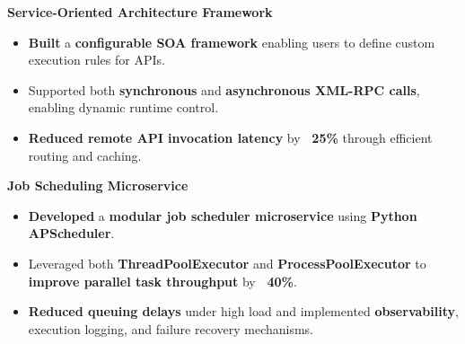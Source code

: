 \documentclass[11 pt]{article}
\begin{document}
\noindent\textbf{Service-Oriented Architecture Framework}
\begin{itemize}
  \item \textbf{Built} a \textbf{configurable SOA framework} enabling users to define custom execution rules for APIs.
  \item Supported both \textbf{synchronous} and \textbf{asynchronous XML-RPC calls}, enabling dynamic runtime control.
  \item \textbf{Reduced remote API invocation latency} by \textbf{~25\%} through efficient routing and caching.
\end{itemize}
\vspace{6pt}

\noindent\textbf{Job Scheduling Microservice}
\begin{itemize}
  \item \textbf{Developed} a \textbf{modular job scheduler microservice} using \textbf{Python APScheduler}.
  \item Leveraged both \textbf{ThreadPoolExecutor} and \textbf{ProcessPoolExecutor} to \textbf{improve parallel task throughput} by \textbf{~40\%}.
  \item \textbf{Reduced queuing delays} under high load and implemented \textbf{observability}, execution logging, and failure recovery mechanisms.
\end{itemize}
\end{document}
